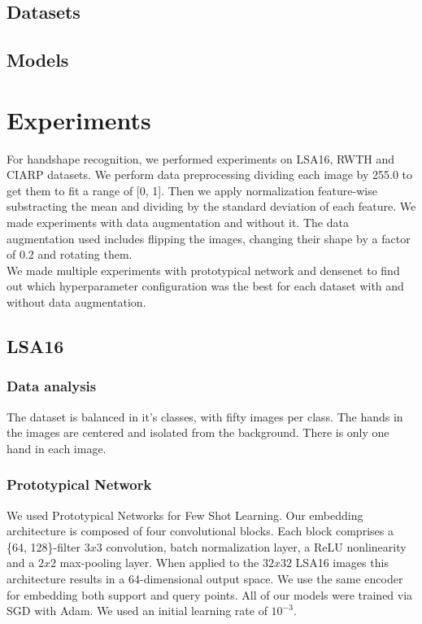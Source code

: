 \documentclass[runningheads,a4paper]{llncs}
\begin{document}
\subsection{Datasets}


\subsection{Models}


\section{Experiments}

For handshape recognition, we performed experiments on LSA16, RWTH and CIARP datasets. We perform data preprocessing dividing each image by 255.0 to get them to fit a range of [0, 1]. Then we apply normalization feature-wise substracting the mean and dividing by the standard deviation of each feature. We made experiments with data augmentation and without it. The data augmentation used includes flipping the images, changing their shape by a factor of 0.2 and rotating them. \\

We made multiple experiments with prototypical network and densenet to find out which hyperparameter configuration was the best for each dataset with and without data augmentation. \\

\subsection{LSA16}

\subsubsection{Data analysis}

The dataset is balanced in it's classes, with fifty images per class. The hands in the images are centered and isolated from the background. There is only one hand in each image.

\subsubsection{Prototypical Network}

We used Prototypical Networks for Few Shot Learning. Our embedding architecture is composed of four convolutional blocks. Each block comprises a \{64, 128\}-filter $3 x 3$ convolution, batch normalization layer, a ReLU nonlinearity and a $2 x 2$ max-pooling layer. When applied to the $32 x 32$ LSA16 images this architecture results in a 64-dimensional output space. We use the same encoder for embedding both support and query points. All of our models were trained via SGD with Adam. We used an initial learning rate of $10^{-3}$. \\
\end{document}
